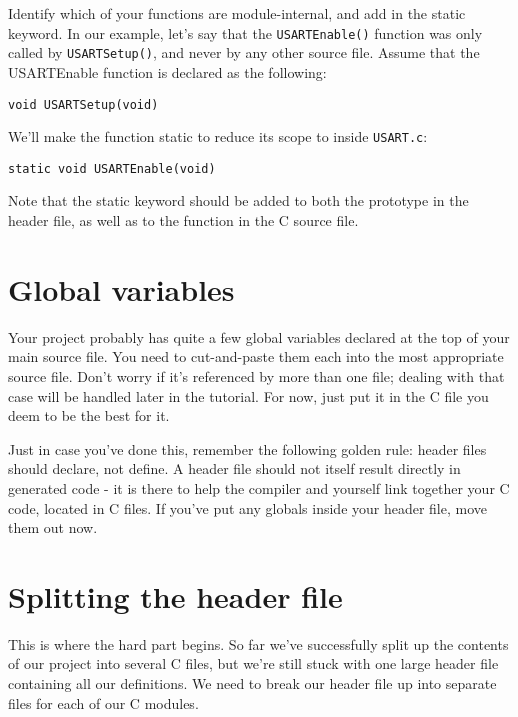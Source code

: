 \documentclass[a4paper,oneside]{book}
\begin{document}
Identify which of your functions are module-internal, and add in the static keyword. In our example, let's say that the \texttt{USARTEnable()} function was only called by \texttt{USARTSetup()}, and never by any other source file. Assume that the USARTEnable function is declared as the following:

\begin{center}
\begin{lstlisting}
void USARTSetup(void)
\end{lstlisting}
\end{center}

We'll make the function static to reduce its scope to inside \texttt{USART.c}:

\begin{center}
\begin{lstlisting}
static void USARTEnable(void)
\end{lstlisting}
\end{center}

Note that the static keyword should be added to both the prototype in the header file, as well as to the function in the C source file.

\section{Global variables}

Your project probably has quite a few global variables declared at the top of your main source file. You need to cut-and-paste them each into the most appropriate source file. Don't worry if it's referenced by more than one file; dealing with that case will be handled later in the tutorial. For now, just put it in the C file you deem to be the best for it.

Just in case you've done this, remember the following golden rule: header files should declare, not define. A header file should not itself result directly in generated code - it is there to help the compiler and yourself link together your C code, located in C files. If you've put any globals inside your header file, move them out now.

\section{Splitting the header file}

This is where the hard part begins. So far we've successfully split up the contents of our project into several C files, but we're still stuck with one large header file containing all our definitions. We need to break our header file up into separate files for each of our C modules.
\end{document}
